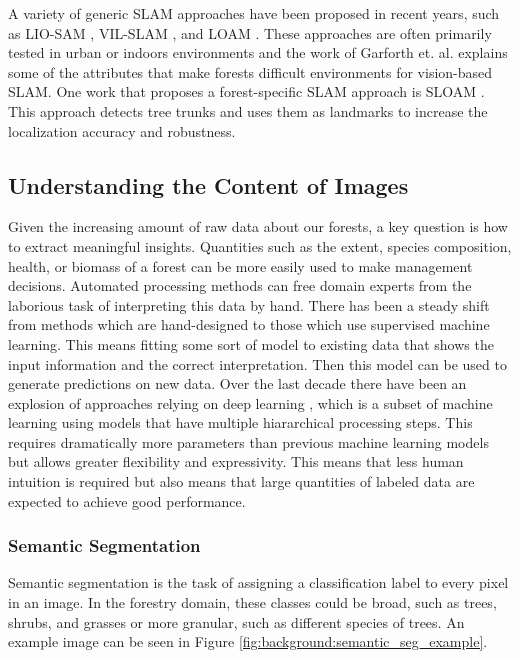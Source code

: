 A variety of generic SLAM approaches have been proposed in recent years, such as LIO-SAM \cite{}, VIL-SLAM \cite{}, and LOAM \cite{}. These approaches are often primarily tested in urban or indoors environments and the work of Garforth et. al. \cite{Garforth2019VisualSLAM} explains some of the attributes that make forests difficult environments for vision-based SLAM. One work that proposes a forest-specific SLAM approach is SLOAM \cite{Chen2020SLOAM:Inventory}. This approach detects tree trunks and uses them as landmarks to increase the localization accuracy and robustness.

\subsection{Understanding the Content of Images}
Given the increasing amount of raw data about our forests, a key question is how to extract meaningful insights. Quantities such as the extent, species composition, health, or biomass of a forest can be more easily used to make management decisions. Automated processing methods can free domain experts from the laborious task of interpreting this data by hand. There has been a steady shift from methods which are hand-designed to those which use supervised machine learning. This means fitting some sort of model to existing data that shows the input information and the correct interpretation. Then this model can be used to generate predictions on new data. Over the last decade there have been an explosion of approaches relying on deep learning \cite{Lecun2015DeepLearning}, which is a subset of machine learning using models that have multiple hiararchical processing steps. This requires dramatically more parameters than previous machine learning models but allows greater flexibility and expressivity. This means that less human intuition is required but also means that large quantities of labeled data are expected to achieve good performance. 
\subsubsection{Semantic Segmentation}
Semantic segmentation is the task of assigning a classification label to every pixel in an image. In the forestry domain, these classes could be broad, such as trees, shrubs, and grasses or more granular, such as different species of trees. An example image can be seen in Figure \ref{fig:background:semantic_seg_example}.

